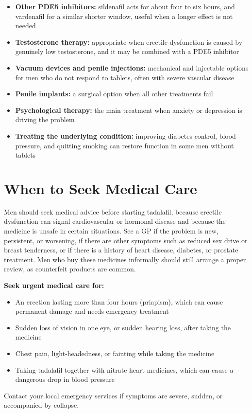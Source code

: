 \begin{itemize}
    \item \textbf{Other PDE5 inhibitors:} sildenafil acts for about four to six hours, and vardenafil for a similar shorter window, useful when a longer effect is not needed
    \item \textbf{Testosterone therapy:} appropriate when erectile dysfunction is caused by genuinely low testosterone, and it may be combined with a PDE5 inhibitor
    \item \textbf{Vacuum devices and penile injections:} mechanical and injectable options for men who do not respond to tablets, often with severe vascular disease
    \item \textbf{Penile implants:} a surgical option when all other treatments fail
    \item \textbf{Psychological therapy:} the main treatment when anxiety or depression is driving the problem
    \item \textbf{Treating the underlying condition:} improving diabetes control, blood pressure, and quitting smoking can restore function in some men without tablets
\end{itemize}

\section*{When to Seek Medical Care}
Men should seek medical advice before starting tadalafil, because erectile dysfunction can signal cardiovascular or hormonal disease and because the medicine is unsafe in certain situations. See a GP if the problem is new, persistent, or worsening, if there are other symptoms such as reduced sex drive or breast tenderness, or if there is a history of heart disease, diabetes, or prostate treatment. Men who buy these medicines informally should still arrange a proper review, as counterfeit products are common.

\textbf{Seek urgent medical care for:}
\begin{itemize}
    \item An erection lasting more than four hours (priapism), which can cause permanent damage and needs emergency treatment
    \item Sudden loss of vision in one eye, or sudden hearing loss, after taking the medicine
    \item Chest pain, light-headedness, or fainting while taking the medicine
    \item Taking tadalafil together with nitrate heart medicines, which can cause a dangerous drop in blood pressure
\end{itemize}
Contact your local emergency services if symptoms are severe, sudden, or accompanied by collapse.

